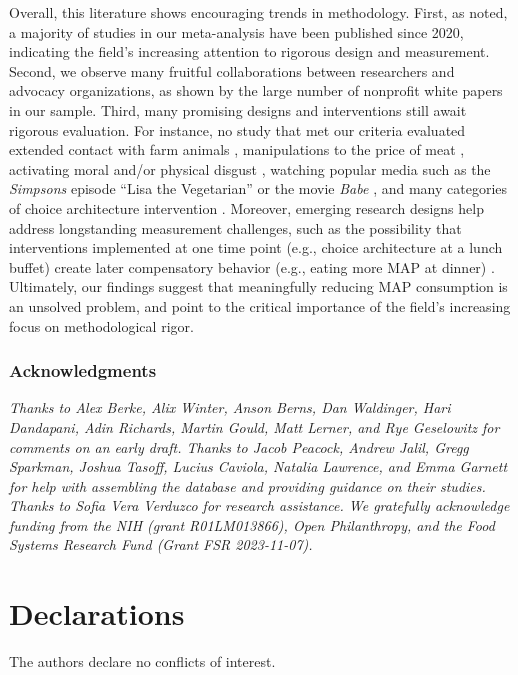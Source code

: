 \documentclass[preprint, 3p,
authoryear]{elsarticle} %
\begin{document}
Overall, this literature shows encouraging trends in methodology. First,
as noted, a majority of studies in our meta-analysis have been published
since 2020, indicating the field's increasing attention to rigorous
design and measurement. Second, we observe many fruitful collaborations
between researchers and advocacy organizations, as shown by the large
number of nonprofit white papers in our sample. Third, many promising
designs and interventions still await rigorous evaluation. For instance,
no study that met our criteria evaluated extended contact with farm
animals \citep{cerrato2022}, manipulations to the price of meat
\citep{wilde2016}, activating moral and/or physical disgust
\citep{palomo2018}, watching popular media such as the \emph{Simpsons}
episode ``Lisa the Vegetarian'' \citep{byrd2010} or the movie
\emph{Babe} \citep{novatna2019}, and many categories of choice
architecture intervention \citep{olafsson2024}. Moreover, emerging
research designs help address longstanding measurement challenges, such
as the possibility that interventions implemented at one time point
(e.g., choice architecture at a lunch buffet) create later compensatory
behavior (e.g., eating more MAP at dinner) \citep{vocski2024}.
Ultimately, our findings suggest that meaningfully reducing MAP
consumption is an unsolved problem, and point to the critical importance
of the field's increasing focus on methodological rigor.

\subsubsection{Acknowledgments}

\emph{Thanks to Alex Berke, Alix Winter, Anson Berns, Dan Waldinger,
Hari Dandapani, Adin Richards, Martin Gould, Matt Lerner, and Rye
Geselowitz for comments on an early draft. Thanks to Jacob Peacock,
Andrew Jalil, Gregg Sparkman, Joshua Tasoff, Lucius Caviola, Natalia
Lawrence, and Emma Garnett for help with assembling the database and
providing guidance on their studies. Thanks to Sofia Vera Verduzco for
research assistance. We gratefully acknowledge funding from the NIH
(grant R01LM013866), Open Philanthropy, and the Food Systems Research
Fund (Grant FSR 2023-11-07).}

\section*{Declarations}\label{declarations}

The authors declare no conflicts of interest. \newpage

\renewcommand\refname{References}

\end{document}

